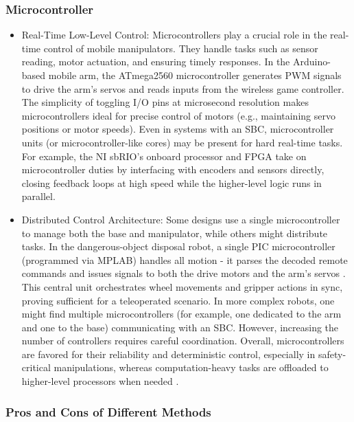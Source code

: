 \documentclass{article}
\begin{document}
\subsubsection{Microcontroller}

\begin{itemize}
  
  \item Real-Time Low-Level Control: Microcontrollers play a crucial role in the real-time control of mobile manipulators. They handle tasks such as sensor reading, motor actuation, and ensuring timely responses. In the Arduino-based mobile arm, the ATmega2560 microcontroller generates PWM signals to drive the arm's servos and reads inputs from the wireless game controller. The simplicity of toggling I/O pins at microsecond resolution makes microcontrollers ideal for precise control of motors (e.g., maintaining servo positions or motor speeds). Even in systems with an SBC, microcontroller units (or microcontroller-like cores) may be present for hard real-time tasks. For example, the NI sbRIO's onboard processor and FPGA take on microcontroller duties by interfacing with encoders and sensors directly, closing feedback loops at high speed while the higher-level logic runs in parallel.
  \item Distributed Control Architecture: Some designs use a single microcontroller to manage both the base and manipulator, while others might distribute tasks. In the dangerous-object disposal robot, a single PIC microcontroller (programmed via MPLAB) handles all motion - it parses the decoded remote commands and issues signals to both the drive motors and the arm's servos \cite{6805994}. This central unit orchestrates wheel movements and gripper actions in sync, proving sufficient for a teleoperated scenario. In more complex robots, one might find multiple microcontrollers (for example, one dedicated to the arm and one to the base) communicating with an SBC. However, increasing the number of controllers requires careful coordination. Overall, microcontrollers are favored for their reliability and deterministic control, especially in safety-critical manipulations, whereas computation-heavy tasks are offloaded to higher-level processors when needed \cite{8710464}.

\end{itemize}

\subsubsection{Pros and Cons of Different Methods}
\end{document}
